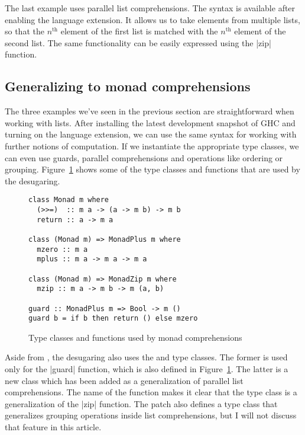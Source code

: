 \documentclass{tmr}
\renewcommand{\th}{\ensuremath{{}^\text{th}}}
\begin{document}
The last example uses parallel list comprehensions. The syntax is available after enabling the 
 language extension. It allows us to take elements from multiple lists, so
that the $n\th$ element of the first list is matched with the $n\th$ element of the 
second list. The same functionality can be easily expressed using the |zip| function. 


\subsection{Generalizing to monad comprehensions}
The three examples we've seen in the previous section are straightforward when working with lists.
After installing the latest development snapshot of GHC and turning on the
 language extension, we can use the same syntax for working
with further notions of computation. If we instantiate the appropriate type classes, we can even use 
guards, parallel comprehensions and operations like ordering or grouping. 
Figure~\ref{fig:monad-defs} shows some of the type classes and functions that are used by the desugaring.

\begin{figure}
\begin{verbatim}
class Monad m where
  (>>=)  :: m a -> (a -> m b) -> m b
  return :: a -> m a

class (Monad m) => MonadPlus m where
  mzero :: m a
  mplus :: m a -> m a -> m a

class (Monad m) => MonadZip m where
  mzip :: m a -> m b -> m (a, b)

guard :: MonadPlus m => Bool -> m ()
guard b = if b then return () else mzero
\end{verbatim}
\caption{Type classes and functions used by monad comprehensions}
\label{fig:monad-defs}
\end{figure}

Aside from , the desugaring also uses the  and  
type classes. The former is used only for the |guard| function, which is also defined in Figure~\ref{fig:monad-defs}. The latter is a new class which has been added as a generalization of parallel
list comprehensions. The name of the function makes it clear that the
type class is a generalization
of the |zip| function. The patch also defines a 
type class that generalizes 
grouping operations inside list comprehensions, but I will not discuss that feature in this article.
\end{document}
